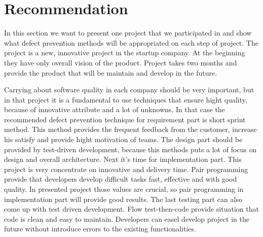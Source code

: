\section{Recommendation}
In this section we want to present one project that we participated in and show what defect prevention methods will be appropriated on each step of project. The project is a new, innovative project in the startup company. At the beginning they have only overall vision of the product. Project takes two months and provide the product that will be maintain and develop in the future. 

Carrying about software quality in each company should be very important, but in that project it is a fundamental to use techniques that ensure hight quality, because of innovative attribute and a lot of unknowns. In that case the recommended defect prevention technique for requirement part is short sprint method. This method provides the frequent feedback from the customer, increase his satisfy and provide hight motivation of teams. The design part should be provided by test-driven development, because this methods puts a lot of focus on design and overall architecture. Next it's time for implementation part. This project is very concentrate on innovative and delivery time. Pair programming provide that developers develop difficult tasks fast, effective and with good quality. In presented project those values are crucial, so pair programming in implementation part will provide good results. The last testing part can also  come up with test driven development. Flow test-then-code provide situation that code is clean and easy to maintain. Developers can easel develop project in the future without introduce errors to the existing functionalities. 
